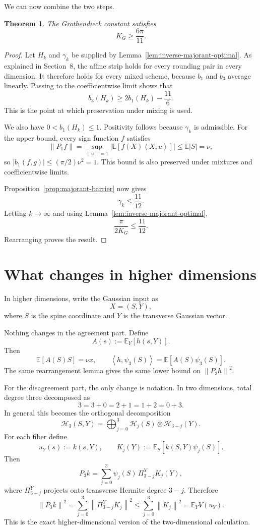 \documentclass[11pt]{article}
\newtheorem{theorem}{Theorem}[section]
\newcommand{\E}{\mathbb E}
\newcommand{\ip}[2]{\left\langle #1,#2\right\rangle}
\newcommand{\norm}[1]{\left\|#1\right\|}
\newcommand{\cH}{\mathcal H}
\begin{document}
We can now combine the two steps.

\begin{theorem}\label{thm:lower-bound}
The Grothendieck constant satisfies
\[
        K_G\ge\frac{6\pi}{11}.
\]
\end{theorem}

\begin{proof}
Let $H_k$ and $\gamma_k$ be supplied by Lemma~\ref{lem:inverse-majorant-optimal}.  As explained in Section~8, the affine strip holds for every rounding pair in every dimension.  It therefore holds for every mixed scheme, because $b_1$ and $b_3$ average linearly.  Passing to the coefficientwise limit shows that
\[
        b_3(H_k)\ge2b_1(H_k)-\frac{11}{6}.
\]
This is the point at which preservation under mixing is used.

We also have $0<b_1(H_k)\le1$.  Positivity follows because $\gamma_k$ is admissible.  For the upper bound, every sign function $f$ satisfies
\[
        \norm{P_1f}
        =\sup_{\norm{u}=1}\left|\E[f(X)\ip{X}{u}]\right|
        \le\E|S|=\nu,
\]
so $|b_1(f,g)|\le(\pi/2)\nu^2=1$.  This bound is also preserved under mixtures and coefficientwise limits.

Proposition~\ref{prop:majorant-barrier} now gives
\[
        \gamma_k\le\frac{11}{12}.
\]
Letting $k\to\infty$ and using Lemma~\ref{lem:inverse-majorant-optimal},
\[
        \frac{\pi}{2K_G}\le\frac{11}{12}.
\]
Rearranging proves the result.
\end{proof}

\section{What changes in higher dimensions}

In higher dimensions, write the Gaussian input as
\[
        X=(S,Y),
\]
where $S$ is the spine coordinate and $Y$ is the transverse Gaussian vector.

Nothing changes in the agreement part.  Define
\[
        A(s):=\E_Y[h(s,Y)].
\]
Then
\[
        \E[A(S)S]=\nu x,
        \qquad
        \ip{h}{\psi_3(S)}=\E[A(S)\psi_3(S)].
\]
The same rearrangement lemma gives the same lower bound on $\norm{P_3h}^2$.

For the disagreement part, the only change is notation.  In two dimensions, total degree three decomposed as
\[
        3=3+0=2+1=1+2=0+3.
\]
In general this becomes the orthogonal decomposition
\[
        \cH_3(S,Y)
        =\bigoplus_{j=0}^3 \cH_j(S)\otimes \cH_{3-j}(Y).
\]
For each fiber define
\[
        u_Y(s):=k(s,Y),
        \qquad
        K_j(Y):=\E_S[k(S,Y)\psi_j(S)].
\]
Then
\[
        P_3k
        =\sum_{j=0}^3 \psi_j(S)\,\Pi_{3-j}^Y K_j(Y),
\]
where $\Pi_{3-j}^Y$ projects onto transverse Hermite degree $3-j$.  Therefore
\[
        \norm{P_3k}^2
        =\sum_{j=0}^3\norm{\Pi_{3-j}^Y K_j}^2
        \le \sum_{j=0}^3\norm{K_j}^2
        =\E_Y V(u_Y).
\]
This is the exact higher-dimensional version of the two-dimensional calculation.
\end{document}
